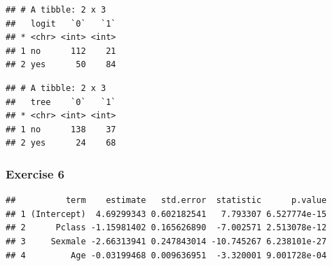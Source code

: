\documentclass[]{article}
\newenvironment{Shaded}{\begin{snugshade}}{\end{snugshade}}
\newcommand{\KeywordTok}[1]{\textcolor[rgb]{0.13,0.29,0.53}{\textbf{#1}}}
\newcommand{\DataTypeTok}[1]{\textcolor[rgb]{0.13,0.29,0.53}{#1}}
\newcommand{\StringTok}[1]{\textcolor[rgb]{0.31,0.60,0.02}{#1}}
\newcommand{\OperatorTok}[1]{\textcolor[rgb]{0.81,0.36,0.00}{\textbf{#1}}}
\newcommand{\NormalTok}[1]{#1}
\begin{document}
\begin{verbatim}
## # A tibble: 2 x 3
##   logit   `0`   `1`
## * <chr> <int> <int>
## 1 no      112    21
## 2 yes      50    84
\end{verbatim}

\begin{Shaded}
\end{Shaded}

\begin{verbatim}
## # A tibble: 2 x 3
##   tree    `0`   `1`
## * <chr> <int> <int>
## 1 no      138    37
## 2 yes      24    68
\end{verbatim}

\subsubsection{Exercise 6}\label{exercise-6}

\begin{Shaded}
\end{Shaded}

\begin{verbatim}
##          term    estimate   std.error  statistic      p.value
## 1 (Intercept)  4.69299343 0.602182541   7.793307 6.527774e-15
## 2      Pclass -1.15981402 0.165626890  -7.002571 2.513078e-12
## 3     Sexmale -2.66313941 0.247843014 -10.745267 6.238101e-27
## 4         Age -0.03199468 0.009636951  -3.320001 9.001728e-04
\end{verbatim}
\end{document}
